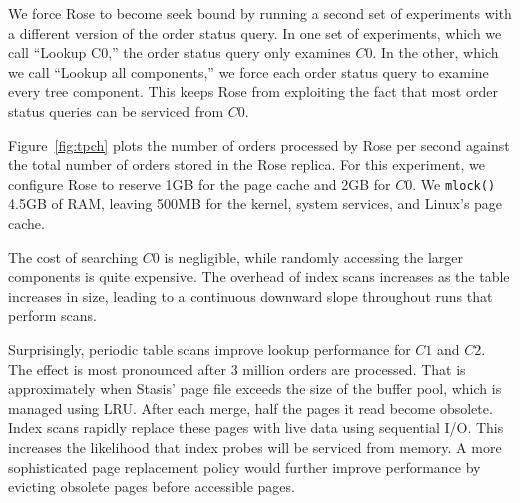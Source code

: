 \documentclass{vldb}
\newcommand{\rows}{Rose\xspace}
\newcommand{\rowss}{Rose's\xspace}
\begin{document}
We force \rows to become seek bound by running a second set of
experiments with a different version of the order status query.  In one set
of experiments, which we call ``Lookup C0,'' the order status query
only examines $C0$.  In the other, which we call ``Lookup all
components,'' we force each order status query to examine every tree
component.  This keeps \rows from exploiting the fact that most order
status queries can be serviced from $C0$.


Figure~\ref{fig:tpch} plots the number of orders processed by \rows
per second against the total number of orders stored in the \rows
replica.  For this experiment, we configure \rows to reserve 1GB for
the page cache and 2GB for $C0$.  We {\tt mlock()} 4.5GB of RAM, leaving
500MB for the kernel, system services, and Linux's page cache.


The cost of searching $C0$ is negligible, while randomly
accessing the larger components is quite expensive.  The overhead of
index scans increases as the table increases in size, leading to a
continuous downward slope throughout runs that perform scans.

Surprisingly, periodic table scans improve lookup
performance for $C1$ and $C2$.  The effect is most pronounced after
3 million orders are processed.  That is approximately
when Stasis' page file exceeds the size of the buffer pool, which is
managed using LRU.  After each merge, half the pages it read
become obsolete.  Index scans rapidly replace these pages with live
data using sequential I/O.  This increases the likelihood that index
probes will be serviced from memory.  A more sophisticated page
replacement policy would further improve performance by evicting
obsolete pages before accessible pages.
\end{document}

